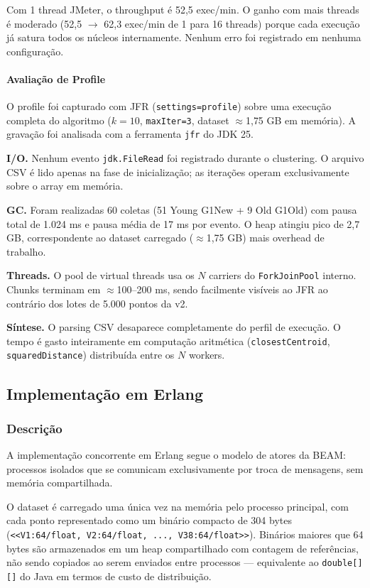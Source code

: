 Com 1 thread JMeter, o throughput é 52{,}5 exec/min. O ganho com mais threads é
moderado (52,5 $\to$ 62,3 exec/min de 1 para 16 threads) porque cada execução já
satura todos os núcleos internamente. Nenhum erro foi registrado em nenhuma
configuração.

\paragraph{Avaliação de Profile}

O profile foi capturado com JFR (\texttt{settings=profile}) sobre uma execução
completa do algoritmo ($k=10$, \texttt{maxIter=3}, dataset $\approx$1{,}75 GB em
memória). A gravação foi analisada com a ferramenta \texttt{jfr} do JDK 25.

\textbf{I/O.}
Nenhum evento \texttt{jdk.FileRead} foi registrado durante o clustering. O arquivo
CSV é lido apenas na fase de inicialização; as iterações operam exclusivamente sobre
o array em memória.

\textbf{GC.}
Foram realizadas 60 coletas (51 Young G1New + 9 Old G1Old) com pausa total de
1.024 ms e pausa média de 17 ms por evento. O heap atingiu pico de 2{,}7 GB,
correspondente ao dataset carregado ($\approx$1{,}75 GB) mais overhead de trabalho.

\textbf{Threads.}
O pool de virtual threads usa os $N$ carriers do \texttt{ForkJoinPool} interno.
Chunks terminam em $\approx$100--200 ms, sendo facilmente visíveis ao JFR ao
contrário dos lotes de 5.000 pontos da v2.

\textbf{Síntese.}
O parsing CSV desaparece completamente do perfil de execução. O tempo é gasto
inteiramente em computação aritmética (\texttt{closestCentroid},
\texttt{squaredDistance}) distribuída entre os $N$ workers.

\subsection{Implementação em Erlang}

\subsubsection{Descrição}

A implementação concorrente em Erlang segue o modelo de atores da BEAM: processos
isolados que se comunicam exclusivamente por troca de mensagens, sem memória compartilhada.

O dataset é carregado uma única vez na memória pelo processo principal, com cada
ponto representado como um binário compacto de 304 bytes
(\texttt{<<V1:64/float, V2:64/float, ..., V38:64/float>>}). Binários maiores que
64 bytes são armazenados em um heap compartilhado com contagem de referências,
não sendo copiados ao serem enviados entre processos --- equivalente ao
\texttt{double[][]} do Java em termos de custo de distribuição.

